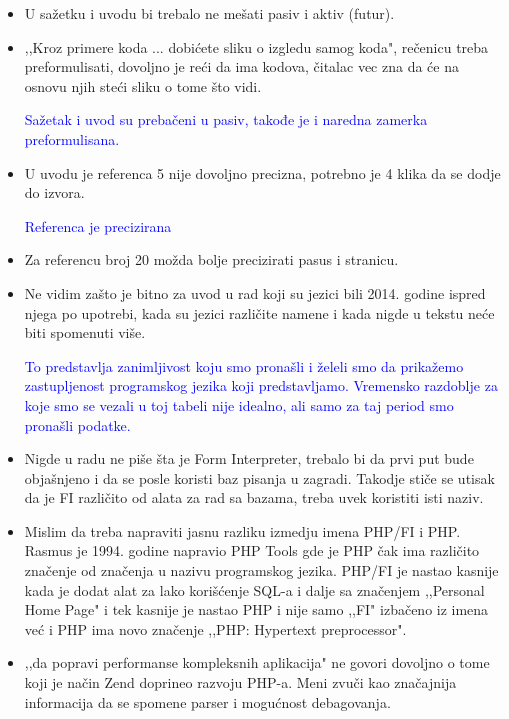 \documentclass[a4paper]{report}
\newcommand{\odgovor}[1]{\textcolor{blue}{#1}}
\begin{document}
\begin{itemize}
\item  U sažetku i uvodu bi trebalo ne mešati pasiv i aktiv (futur).
\item  ,,Kroz primere koda ... dobićete sliku o izgledu samog koda", rečenicu treba preformulisati, dovoljno je reći da ima kodova, čitalac vec zna da će na osnovu njih steći sliku o tome što vidi.

\odgovor{Sažetak i uvod su prebačeni u pasiv, takođe je i naredna zamerka preformulisana.}

\item U uvodu je referenca 5 nije dovoljno precizna, potrebno je 4 klika da se dodje do izvora.

\odgovor{Referenca je precizirana}

\item Za referencu broj 20 možda bolje precizirati pasus i stranicu.


\item Ne vidim zašto je bitno za uvod u rad koji su jezici bili 2014. godine ispred njega po upotrebi, kada su jezici različite namene i kada nigde u tekstu neće biti spomenuti više.

\odgovor{To predstavlja zanimljivost koju smo pronašli i želeli smo da prikažemo zastupljenost programskog jezika koji predstavljamo.
Vremensko razdoblje za koje smo se vezali u toj tabeli nije idealno, ali samo za taj period smo pronašli podatke.}

\item Nigde u radu ne piše šta je Form Interpreter, trebalo bi da prvi put bude objašnjeno i da se posle koristi baz pisanja u zagradi. Takodje stiče se utisak da je FI različito od alata za rad sa bazama, treba uvek koristiti isti naziv.

\odgovor{}

\item Mislim da treba napraviti jasnu razliku izmedju imena PHP/FI i PHP. Rasmus je 1994. godine napravio PHP Tools gde je PHP čak ima različito značenje od značenja u nazivu programskog jezika. PHP/FI je nastao kasnije kada je dodat alat za lako korišćenje SQL-a i dalje sa značenjem ,,Personal Home Page" i tek kasnije je nastao PHP i nije samo ,,FI" izbačeno iz imena već i PHP ima novo značenje ,,PHP: Hypertext preprocessor". 

\odgovor{}

\item ,,da popravi performanse kompleksnih aplikacija" ne govori dovoljno o tome koji je način Zend doprineo razvoju PHP-a. Meni zvuči kao značajnija informacija da se spomene parser i mogućnost debagovanja.


\end{itemize}
\end{document}
